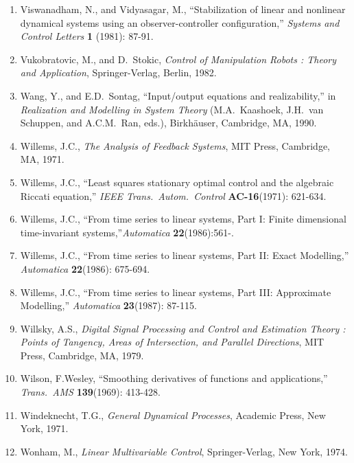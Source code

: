 \begin{enumerate}
\item
Viswanadham, N., and Vidyasagar, M., ``Stabilization of linear and nonlinear
dynamical systems using an observer-controller configuration,'' {\it Systems
and Control Letters} {\bf 1} (1981): 87-91.

\item
Vukobratovic, M., and D.\ Stokic, {\it Control of Manipulation Robots : Theory
and Application}, Springer-Verlag, Berlin, 1982.

\item
Wang, Y., and E.D.\ Sontag, ``Input/output equations and realizability,'' in
{\it Realization and Modelling in System Theory} (M.A.\ Kaashoek, J.H.\ van
Schuppen, and A.C.M.\ Ran, eds.), Birkh\"auser, Cambridge, MA, 1990.

\item
Willems, J.C., {\it The Analysis of Feedback Systems}, MIT Press, Cambridge,
MA, 1971.

\item
Willems, J.C., ``Least squares stationary optimal control and the algebraic
Riccati equation,'' {\it IEEE Trans.\ Autom.\ Control} {\bf AC-16}(1971):
621-634.

\item
Willems, J.C., ``From time series to linear systems, Part I: Finite
dimensional time-invariant systems,''{\it Automatica} {\bf
22}(1986):561-.

\item
Willems, J.C., ``From time series to linear systems, Part II: Exact
Modelling,'' {\it Automatica} {\bf 22}(1986): 675-694.

\item
Willems, J.C., ``From time series to linear systems, Part III: Approximate
Modelling,'' {\it Automatica} {\bf 23}(1987): 87-115.

\item
Willsky, A.S., {\it Digital Signal Processing and Control and Estimation
Theory : Points of Tangency, Areas of Intersection, and Parallel Directions},
MIT Press, Cambridge, MA, 1979.

\item
Wilson, F.Wesley, ``Smoothing derivatives of functions and applications,''
{\it Trans.\ AMS} {\bf 139}(1969): 413-428.

\item
Windeknecht, T.G., {\it General Dynamical Processes}, Academic Press, New
York, 1971.

\item
Wonham, M., {\it Linear Multivariable Control}, Springer-Verlag, New York,
1974.


\end{enumerate}
